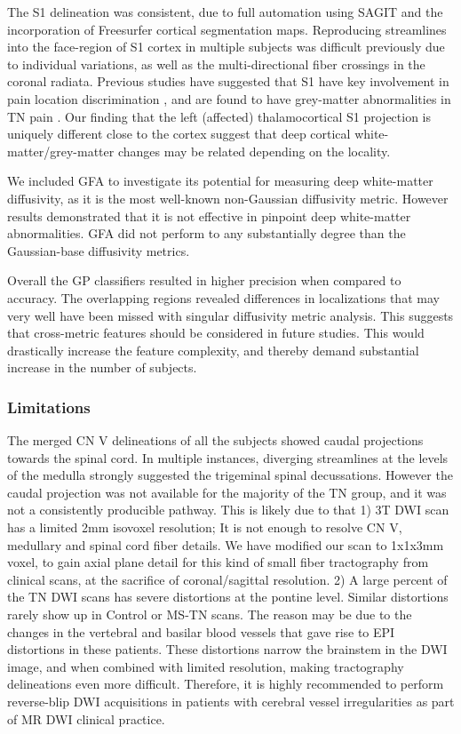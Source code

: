 The S1 delineation was consistent, due to full automation using SAGIT and the incorporation of Freesurfer cortical segmentation maps. Reproducing streamlines into the face-region of S1 cortex in multiple subjects was difficult previously due to individual variations, as well as the multi-directional fiber crossings in the coronal radiata. Previous studies have suggested that S1 have key involvement in pain location discrimination \cite{bushnell1999pain}, and are found to have grey-matter abnormalities in TN pain \cite{Desouza2013c}. Our finding that the left (affected) thalamocortical S1 projection is uniquely different close to the cortex suggest that deep cortical white-matter/grey-matter changes may be related depending on the locality. 

We included GFA to investigate its potential for measuring deep white-matter diffusivity, as it is the most well-known non-Gaussian diffusivity metric. However results demonstrated that it is not effective in pinpoint deep white-matter abnormalities. GFA did not perform to any substantially degree than the Gaussian-base diffusivity metrics. 

Overall the GP classifiers resulted in higher precision when compared to accuracy. The overlapping regions revealed differences in localizations that may very well have been missed with singular diffusivity metric analysis. This suggests that cross-metric features should be considered in future studies. This would drastically increase the feature complexity, and thereby demand substantial increase in the number of subjects. 

\subsubsection{Limitations}
The merged CN V delineations of all the subjects showed caudal projections towards the spinal cord. In multiple instances, diverging streamlines at the levels of the medulla strongly suggested the trigeminal spinal decussations. However the caudal projection was not available for the majority of the TN group, and it was not a consistently producible pathway. This is likely due to that 1) 3T DWI scan has a limited 2mm isovoxel resolution; It is not enough to resolve CN V, medullary and spinal cord fiber details. We have modified our scan to 1x1x3mm voxel, to gain axial plane detail for this kind of small fiber tractography from clinical scans, at the sacrifice of coronal/sagittal resolution. 2) A large percent of the TN DWI scans has severe distortions at the pontine level. Similar distortions rarely show up in Control or MS-TN scans. The reason may be due to the changes in the vertebral and basilar blood vessels that gave rise to EPI distortions in these patients. These distortions narrow the brainstem in the DWI image, and when combined with limited resolution, making tractography delineations even more difficult. Therefore, it is highly recommended to perform reverse-blip DWI acquisitions in patients with cerebral vessel irregularities as part of MR DWI clinical practice. 


